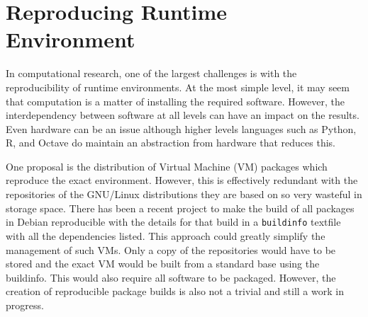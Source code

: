 

\section{Reproducing Runtime Environment}

In computational research, one of the largest challenges
is with the reproducibility of
runtime environments.  At the most simple level, it may seem that
computation is a
matter of installing the required software.  However, the
interdependency between software at all levels can have an impact on
the results.  Even hardware can be an issue although higher levels
languages such as Python, R, and Octave do maintain an abstraction from
hardware that reduces this.

One proposal is the distribution of Virtual Machine (VM) packages which
reproduce the exact environment.  However, this is effectively redundant with
the repositories of the GNU/Linux distributions they are based on so
very wasteful in storage space.
There has been a recent project to make the build of all packages in
Debian reproducible with the details for that build in a
\texttt{buildinfo} textfile with all the dependencies listed.
This approach could greatly simplify the management of such VMs.  Only
a copy of the repositories would
have to be stored and the exact VM would be built from a standard base
using the buildinfo.
This would also require all software to be packaged.
However, the creation of reproducible package builds is also not a trivial and
still a work in progress.

